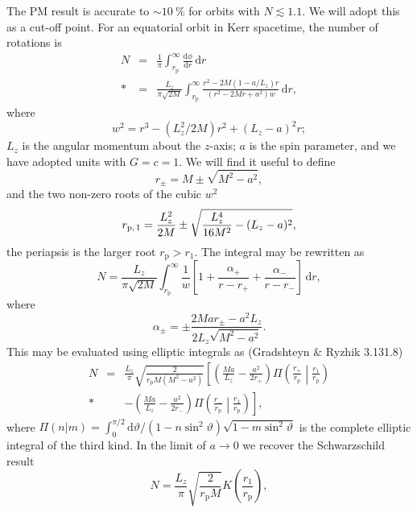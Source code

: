 \documentclass[aps,prd,reprint,showpacs,groupedaddress]{revtex4-1}
\newcommand{\sub}[1]{\ensuremath{_\text{#1}}}
\newcommand{\dd}{\ensuremath{\mathrm{d}}}
\newcommand{\diff}[2]{\ensuremath{\frac{\dd {#1}}{\dd {#2}}}}
\newcommand{\intd}[4]{\ensuremath{\int_{#1}^{#2}{#3}\,\dd{#4}}}
\newcommand{\recip}[1]{\ensuremath{\frac{1}{#1}}}
\begin{document}
The PM result is accurate to $\sim \SI{10}{\percent}$ for orbits with $N \lesssim 1.1$. We will adopt this as a cut-off point. For an equatorial orbit in Kerr spacetime, the number of rotations is
\begin{eqnarray}
N & = & \recip{\pi}\intd{r\sub{p}}{\infty}{\diff{\phi}{r}}{r} \nonumber \\*
 & = & \frac{L_z}{\pi\sqrt{2M}}\intd{r\sub{p}}{\infty}{\frac{r^2 - 2M(1 - a/L_z)r}{(r^2 - 2Mr + a^2)w}}{r},
\end{eqnarray}
where
\begin{equation}
w^2 = r^3 - (L_z^2/2M)r^2 + (L_z - a)^2r;
\end{equation}
$L_z$ is the angular momentum about the $z$-axis; $a$ is the spin parameter, and we have adopted units with $G = c = 1$. We will find it useful to define
\begin{equation}
r_\pm = M \pm \sqrt{M^2 - a^2},
\end{equation}
and the two non-zero roots of the cubic $w^2$
\begin{equation}
r\sub{p,\,1} = \frac{L_z^2}{2M} \pm \sqrt{\frac{L_z^4}{16M^2} - (L_z -a)^2},
\end{equation}
the periapsis is the larger root $r\sub{p} > r_1$. The integral may be rewritten as
\begin{equation}
N = \frac{L_z}{\pi\sqrt{2M}}\intd{r\sub{p}}{\infty}{\recip{w}\left[1 + \frac{\alpha_+}{r-r_+} + \frac{\alpha_-}{r-r_-}\right]}{r},
\end{equation}
where
\begin{equation}
\alpha_\pm = \pm\frac{2Mar_\pm - a^2L_z}{2L_z\sqrt{M^2-a^2}}.
\end{equation}
This may be evaluated using elliptic integrals as (Gradshteyn \& Ryzhik\cite{Gradshteyn2000} 3.131.8)
\begin{eqnarray}
N & = & \frac{L_z}{\pi}\sqrt{\frac{2}{r\sub{p}M(M^2-a^2)}}\left[\left(\frac{Ma}{L_z} - \frac{a^2}{2r_+}\right)\Pi\left(\frac{r_+}{r\sub{p}}\middle|\frac{r_1}{r\sub{p}}\right) \right. \nonumber \\*
 & & \left. - \left(\frac{Ma}{L_z} - \frac{a^2}{2r_-}\right)\Pi\left(\frac{r_-}{r\sub{p}}\middle|\frac{r_1}{r\sub{p}}\right)\right],
\end{eqnarray}
where $\Pi(n|m) = \int_{0}^{\pi/2}{\dd\vartheta/(1-n\sin^2\vartheta)\sqrt{1-m\sin^2\vartheta}}$ is the complete elliptic integral of the third kind. In the limit of $a \rightarrow 0$ we recover the Schwarzschild result\cite{Cutler1994}
\begin{equation}
N = \frac{L_z}{\pi}\sqrt{\frac{2}{r\sub{p}M}}K\left(\frac{r_1}{r\sub{p}}\right),
\end{equation}
\end{document}
